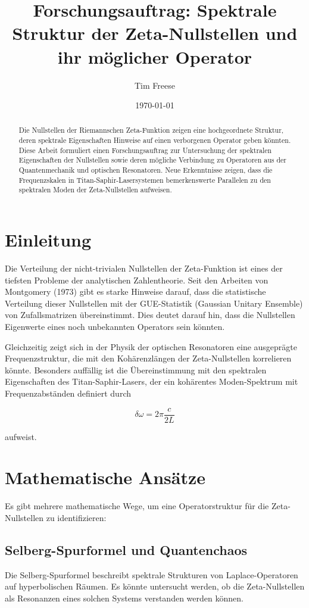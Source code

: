 \documentclass[a4paper,12pt]{article}
\title{Forschungsauftrag: Spektrale Struktur der Zeta-Nullstellen und ihr möglicher Operator}
\author{Tim Freese}
\date{\today}
\begin{document}
\maketitle

\begin{abstract}
Die Nullstellen der Riemannschen Zeta-Funktion zeigen eine hochgeordnete Struktur, deren spektrale Eigenschaften Hinweise auf einen verborgenen Operator geben könnten. Diese Arbeit formuliert einen Forschungsauftrag zur Untersuchung der spektralen Eigenschaften der Nullstellen sowie deren mögliche Verbindung zu Operatoren aus der Quantenmechanik und optischen Resonatoren. Neue Erkenntnisse zeigen, dass die Frequenzskalen in Titan-Saphir-Lasersystemen bemerkenswerte Parallelen zu den spektralen Moden der Zeta-Nullstellen aufweisen. 
\end{abstract}

\section{Einleitung}
Die Verteilung der nicht-trivialen Nullstellen der Zeta-Funktion ist eines der tiefsten Probleme der analytischen Zahlentheorie. Seit den Arbeiten von Montgomery (1973) gibt es starke Hinweise darauf, dass die statistische Verteilung dieser Nullstellen mit der GUE-Statistik (Gaussian Unitary Ensemble) von Zufallsmatrizen übereinstimmt. Dies deutet darauf hin, dass die Nullstellen Eigenwerte eines noch unbekannten Operators sein könnten.

Gleichzeitig zeigt sich in der Physik der optischen Resonatoren eine ausgeprägte Frequenzstruktur, die mit den Kohärenzlängen der Zeta-Nullstellen korrelieren könnte. Besonders auffällig ist die Übereinstimmung mit den spektralen Eigenschaften des Titan-Saphir-Lasers, der ein kohärentes Moden-Spektrum mit Frequenzabständen definiert durch 

\begin{equation}
\delta\omega = 2\pi \frac{c}{2L}
\end{equation}

aufweist.

\section{Mathematische Ansätze}
Es gibt mehrere mathematische Wege, um eine Operatorstruktur für die Zeta-Nullstellen zu identifizieren:

\subsection{Selberg-Spurformel und Quantenchaos}
Die Selberg-Spurformel beschreibt spektrale Strukturen von Laplace-Operatoren auf hyperbolischen Räumen. Es könnte untersucht werden, ob die Zeta-Nullstellen als Resonanzen eines solchen Systems verstanden werden können.
\end{document}
